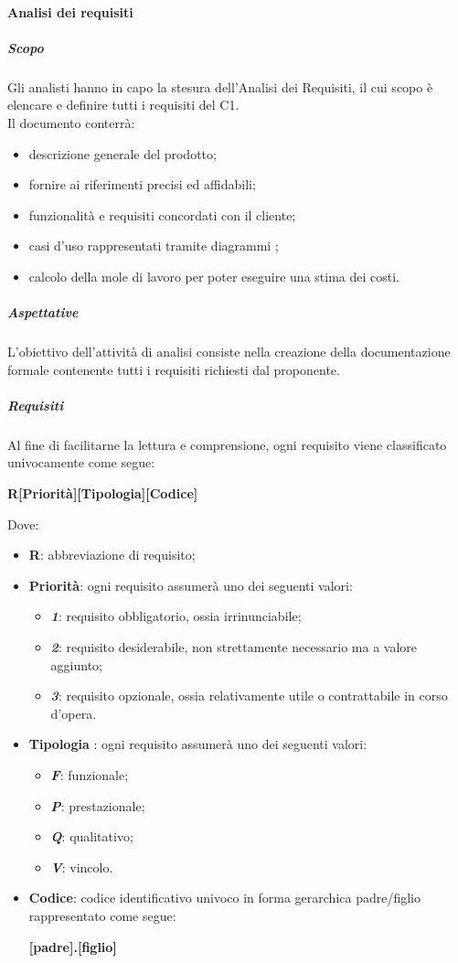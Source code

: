 			\paragraph{Analisi dei requisiti}
				\subparagraph{Scopo}
				Gli analisti hanno in capo la stesura dell'Analisi dei Requisiti, il cui scopo è elencare e definire tutti i requisiti del C1.
				\\ 
				Il documento conterrà:
				\begin{itemize}
					\item descrizione generale del prodotto;
					\item fornire ai  riferimenti precisi ed affidabili;
					\item funzionalità e requisiti concordati con il cliente;
					\item casi d'uso rappresentati tramite diagrammi ;	
					\item calcolo della mole di lavoro per poter eseguire una stima dei costi.			
				\end{itemize}
				\subparagraph{Aspettative}
				L'obiettivo dell'attività di analisi consiste nella creazione della documentazione formale contenente tutti i requisiti richiesti dal proponente.
				\subparagraph{Requisiti}
				Al fine di facilitarne la lettura e comprensione, ogni requisito viene classificato univocamente come segue:				
				\begin{center}
					\textbf{R[Priorità][Tipologia][Codice]}
				\end{center}
				Dove:
				\begin{itemize}
					\item \textbf{R}: abbreviazione di requisito;
					\item \textbf{Priorità}: ogni requisito assumerà uno dei seguenti valori:
					\begin{itemize}
						\item \textbf{\textit{1}}: requisito obbligatorio, ossia irrinunciabile;
						\item \textbf{\textit{2}}: requisito desiderabile, non strettamente necessario ma a valore aggiunto;
						\item \textbf{\textit{3}}: requisito opzionale, ossia relativamente utile o contrattabile in corso d'opera.
					\end{itemize}
					\item \textbf{Tipologia} : ogni requisito assumerà uno dei seguenti valori:
					\begin{itemize}
						\item \textbf{\textit{F}}: funzionale;
						\item \textbf{\textit{P}}: prestazionale;
						\item \textbf{\textit{Q}}: qualitativo;
						\item \textbf{\textit{V}}: vincolo.
					\end{itemize}
					\item \textbf{Codice}: codice identificativo univoco in forma gerarchica padre/figlio rappresentato come segue:
					\begin{center}
						\textbf{[padre].[figlio]}
					\end{center}
				\end{itemize}				
